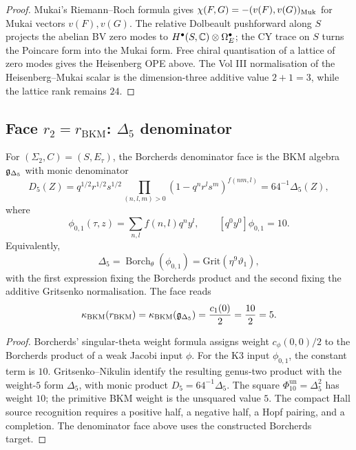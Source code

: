 \begin{proof}
Mukai's Riemann--Roch formula gives
\(\chi(F,G)=-(v(F),v(G))_{\mathrm{Muk}}\) for Mukai vectors
\(v(F),v(G)\).  The relative Dolbeault pushforward along \(S\) projects
the abelian BV zero modes to \(H^\bullet(S,\mathbb{C})\otimes\Omega_E^\bullet\);
the CY trace on \(S\) turns the Poincare form into the Mukai form.  Free
chiral quantisation of a lattice of zero modes gives the Heisenberg OPE
above.  The Vol III normalisation of the Heisenberg--Mukai scalar is the
dimension-three additive value \(2+1=3\), while the lattice rank remains
\(24\).
\end{proof}

\subsection{Face $r_2=r_{\mathrm{BKM}}$: $\Delta_5$ denominator}
\label{wn:subsec:r2-BKM}

\begin{proposition}
\label{wn:prop:r2-BKM-witness}
For \((\Sigma_2,C)=(S,E_\tau)\), the Borcherds denominator face is the
BKM algebra \(\mathfrak{g}_{\Delta_5}\) with monic denominator
\[
  D_5(Z)
  =
  q^{1/2}r^{1/2}s^{1/2}
  \prod_{(n,l,m)>0}(1-q^nr^ls^m)^{f(nm,l)}
  =64^{-1}\Delta_5(Z),
\]
where
\[
  \phi_{0,1}(\tau,z)=\sum_{n,l} f(n,l)q^ny^l,\qquad
  [q^0y^0]\phi_{0,1}=10.
\]
Equivalently,
\[
  \Delta_5=\operatorname{Borch}_{\theta}(\phi_{0,1})
  =\mathrm{Grit}(\eta^9\vartheta_1),
\]
with the first expression fixing the Borcherds product and the second
fixing the additive Gritsenko normalisation.  The face reads
\[
  \kappa_{\mathrm{BKM}}(r_{\mathrm{BKM}})
  =\kappa_{\mathrm{BKM}}(\mathfrak{g}_{\Delta_5})
  =\frac{c_1(0)}2
  =\frac{10}{2}
  =5.
\]
\end{proposition}

\begin{proof}
Borcherds' singular-theta weight formula assigns weight
\(c_\phi(0,0)/2\) to the Borcherds product of a weak Jacobi input
\(\phi\).  For the K3 input \(\phi_{0,1}\), the constant term is \(10\).
Gritsenko--Nikulin identify the resulting genus-two product with the
weight-\(5\) form \(\Delta_5\), with monic product
\(D_5=64^{-1}\Delta_5\).  The square \(\Phi_{10}^{\mathrm{un}}=\Delta_5^2\)
has weight \(10\); the primitive BKM weight is the unsquared value \(5\).
The compact Hall source recognition requires a positive half, a negative
half, a Hopf pairing, and a completion.  The denominator face above uses
the constructed Borcherds target.
\end{proof}

